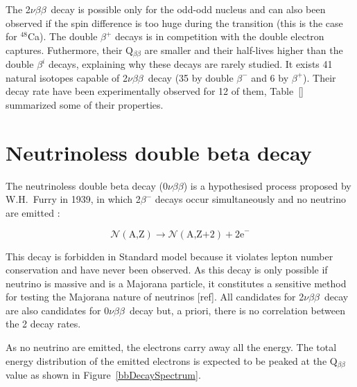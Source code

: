 \documentclass[main.tex]{subfiles}
\begin{document}
\NI The 2$\nu\beta\beta$~decay is possible only for the odd-odd nucleus and can also been observed if the spin difference is too huge during the transition (this is the case for $^{\text{48}}$Ca). The double $\beta^{+}$ decays is in competition with the double electron captures. Futhermore, their Q$_{\beta\beta}$ are smaller and their half-lives higher than the double $\beta^{i}$ decays, explaining why these decays are rarely studied. It exists 41 natural isotopes capable of 2$\nu\beta\beta$~decay (35 by double $\beta^{-}$ and 6 by $\beta^{+}$). Their decay rate have been experimentally observed for 12 of them, Table~[] summarized some of their properties.


\section{Neutrinoless double beta decay}\label{sec:0nubb}


\NI The neutrinoless double beta decay (0$\nu\beta\beta$) is a hypothesised process proposed by W.H.~Furry in 1939, in which 2$\beta^{-}$ decays occur simultaneously and no neutrino are emitted :


\begin{equation}
\mathcal{N} (\text{A,Z}) \rightarrow \mathcal{N} (\text{A,Z+2}) + \text{2e}^- 
\end{equation}


\bigskip


\NI This decay is forbidden in Standard model because it violates lepton number conservation and have never been observed. As this decay is only possible if neutrino is massive and is a Majorana particle, it constitutes a sensitive method for testing the Majorana nature of neutrinos [ref]. All candidates for 2$\nu\beta\beta$~decay are also candidates for 0$\nu\beta\beta$~decay but, a priori, there is no correlation between the 2 decay rates. 


\bigskip


\NI As no neutrino are emitted, the electrons carry away all the energy. The total energy distribution of the emitted electrons is expected to be peaked at the Q$_{\beta\beta}$ value as shown in Figure~\ref{bbDecaySpectrum}.
\end{document}
